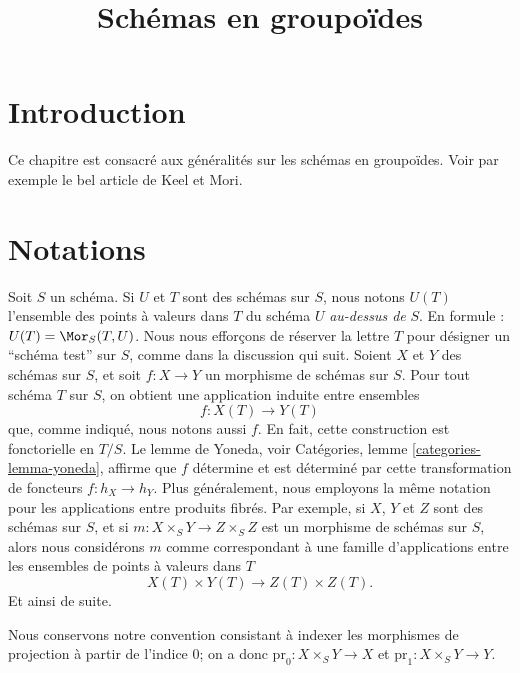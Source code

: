 

%


\title{Schémas en groupoïdes}


\maketitle

\label{section-phantom}

\tableofcontents

\section{Introduction}
\label{section-introduction}

\noindent
Ce chapitre est consacré aux généralités sur les schémas en groupoïdes.
Voir par exemple le bel article \cite{K-M} de Keel et Mori.





\section{Notations}
\label{section-notation}

\noindent
Soit $S$ un schéma. Si $U$ et $T$ sont des schémas sur $S$, nous notons
$U(T)$ l'ensemble des points à valeurs dans $T$ du schéma $U$ {\it au-dessus de} $S$. En formule :
$U(T) = \Mor_S(T, U)$. Nous nous efforçons de réserver la lettre $T$ pour désigner
un ``schéma test'' sur $S$, comme dans la discussion qui suit.
Soient $X$ et $Y$ des schémas sur
$S$, et soit $f : X \to Y$ un morphisme de schémas sur $S$.
Pour tout schéma $T$ sur $S$, on obtient une application induite entre ensembles
$$
f : X(T) \longrightarrow Y(T)
$$
que, comme indiqué, nous notons aussi $f$. En fait, cette construction
est fonctorielle en $T/S$. Le lemme de Yoneda, voir Catégories,
lemme \ref{categories-lemma-yoneda}, affirme que $f$ détermine et est
déterminé par cette transformation de foncteurs $f : h_X \to h_Y$.
Plus généralement, nous employons la même notation pour les applications entre produits
fibrés. Par exemple, si
$X$, $Y$ et $Z$ sont des schémas sur $S$, et si
$m : X \times_S Y \to Z \times_S Z$ est
un morphisme de schémas sur $S$, alors nous considérons $m$ comme correspondant
à une famille d'applications entre les ensembles de points à valeurs dans $T$
$$
X(T) \times Y(T) \longrightarrow Z(T) \times Z(T).
$$
Et ainsi de suite.

\medskip\noindent
Nous conservons notre convention consistant à indexer les morphismes de projection à partir de
l'indice $0$; on a donc $\text{pr}_0 : X \times_S Y \to X$ et
$\text{pr}_1 : X \times_S Y \to Y$.






